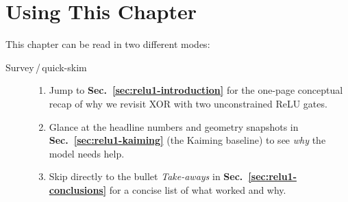 \section{Using This Chapter}
\label{sec:relu1-using}

This chapter can be read in two different modes:

\begin{description}
  \item[Survey\,/\,quick-skim]
        \begin{enumerate}
          \item Jump to \textbf{Sec.~\ref{sec:relu1-introduction}} for the one-page conceptual recap of why we revisit XOR with two unconstrained ReLU gates.
          \item Glance at the headline numbers and geometry snapshots in \textbf{Sec.~\ref{sec:relu1-kaiming}} (the Kaiming baseline) to see \emph{why} the model needs help.
          \item Skip directly to the bullet \emph{Take-aways} in \textbf{Sec.~\ref{sec:relu1-conclusions}} for a concise list of what worked and why.
        \end{enumerate}


\end{description}
